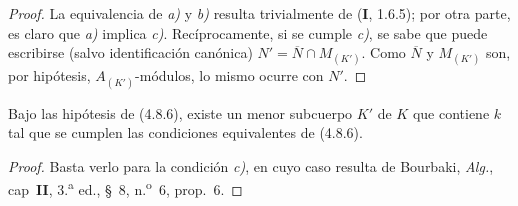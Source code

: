 
\begin{proof}
La equivalencia de \emph{a)} y \emph{b)} resulta trivialmente de (\textbf I, 1.6.5); por otra parte,
es claro que \emph{a)} implica \emph{c)}. Recíprocamente, si se cumple \emph{c)}, se sabe que puede
escribirse (salvo identificación canónica)
$N'=\overline N\cap M_{(K')}$. Como $\overline N$ y $M_{(K')}$ son, por
hipótesis, $A_{(K')}$-módulos, lo mismo ocurre con $N'$.
\end{proof}

\begin{corollary}[4.8.7]
\label{IV.2.4.8.7-fr}
Bajo las hipótesis de \textup{(4.8.6)}, existe un menor subcuerpo $K'$ de $K$ que
contiene $k$ tal que se cumplen las condiciones equivalentes de \textup{(4.8.6)}.
\end{corollary}

\begin{proof}
Basta verlo para la condición \emph{c)}, en cuyo caso resulta de Bourbaki,
\emph{Alg.}, cap~\textbf{II}, 3.\textsuperscript{a} ed., \S~8,
n.\textsuperscript{o}~6, prop.~6.
\end{proof}

